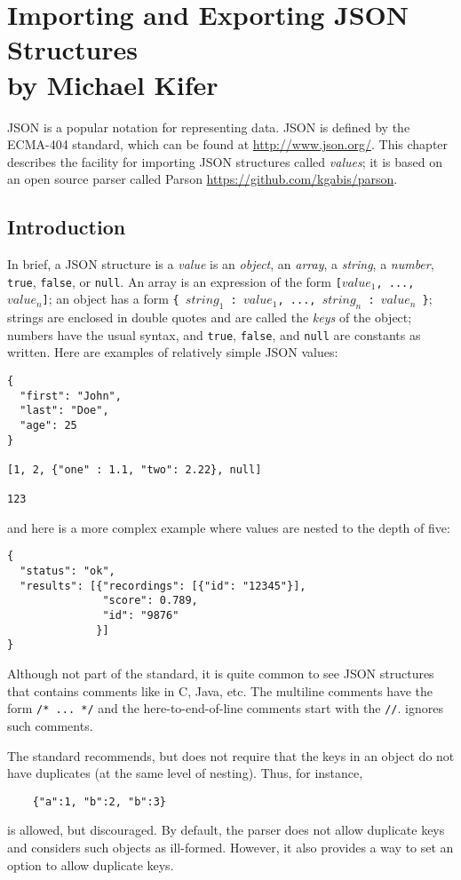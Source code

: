 \chapter[Importing JSON Structures]
{Importing and Exporting JSON Structures\\
  {\Large by Michael Kifer}}

JSON is a popular notation for representing data. JSON is defined
by the ECMA-404 standard, which can be found at \url{http://www.json.org/}.
This chapter describes the \ERGO facility for importing JSON structures
called \emph{values}; it is based on an open source parser called Parson
\url{https://github.com/kgabis/parson}.

\section{Introduction}

In brief, a JSON structure is a \emph{value}  is an \emph{object}, an
\emph{array}, a \emph{string}, a \emph{number},  \texttt{true}, \texttt{false},
or \texttt{null}. An array is an expression of the form
\texttt{[$value_1$, ..., $value_n$]}; an object has a form
\texttt{\{ $string_1$ : $value_1$,  ..., $string_n$ : $value_n$
  \}}; strings are enclosed in double quotes and are called the \emph{keys}
of the object; numbers have the usual
syntax, and \texttt{true}, \texttt{false}, and \texttt{null} are constants
as written. Here are examples of relatively simple JSON values:
\begin{verbatim}
{
  "first": "John",
  "last": "Doe",
  "age": 25
}

[1, 2, {"one" : 1.1, "two": 2.22}, null]

123
\end{verbatim}
and here is a more complex example where values are nested to the depth of
five:
\begin{verbatim}
{
  "status": "ok",
  "results": [{"recordings": [{"id": "12345"}],
               "score": 0.789,
               "id": "9876"
              }]
}
\end{verbatim}

Although not part of the standard, it is quite common to see JSON
structures that contains comments like in C, Java, etc. The multiline
comments have the form \texttt{/* ... */} and the here-to-end-of-line
comments start with the \texttt{//}. \ERGO ignores such comments.

The standard recommends, but does not require that the keys in an object
do not have duplicates (at the same level of nesting). Thus, for instance,
\begin{verbatim}
    {"a":1, "b":2, "b":3}
\end{verbatim}
is allowed, but discouraged. By default, the \ERGO parser does not allow
duplicate keys and considers such objects as ill-formed. However, it also
provides a way to set an option to allow duplicate keys.


